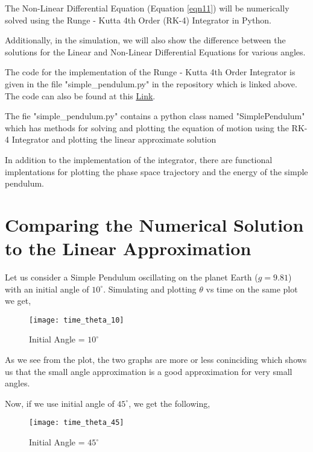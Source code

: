 \documentclass[12pt]{article}
\begin{document}
The Non-Linear Differential Equation (Equation \ref{eqn11}) will be numerically solved using the
Runge - Kutta 4th Order (RK-4) Integrator in Python.

Additionally, in the simulation, we will also show the difference between the solutions for
the Linear and Non-Linear Differential Equations for various angles. \newline

The code for the implementation of the Runge - Kutta 4th Order Integrator is given in the file "simple\_pendulum.py"
in the repository which is linked above. The code can also be found at this \textcolor{blue}{\underline{\href{https://github.com/kkin1995/simulations/simple_pendulum.py}{Link}}}. \newline

The fie "simple\_pendulum.py" contains a python class named "SimplePendulum" which has methods for solving and plotting the equation of motion using
the RK-4 Integrator and plotting the linear approximate solution \newline

In addition to the implementation of the integrator, there are functional implentations for plotting the phase space trajectory and the energy
of the simple pendulum. \newline

\section{Comparing the Numerical Solution to the Linear Approximation}

Let us consider a Simple Pendulum oscillating on the planet Earth ($g = 9.81$) with an initial angle of $10^\circ$. Simulating and plotting
$\theta$ vs time on the same plot we get,

\begin{figure}[H]
    \centering
    \caption{Initial Angle = $10^\circ$}
    \texttt{[image: time\_theta\_10]}
    \label{fig:theta10}
\end{figure}

As we see from the plot, the two graphs are more or less coninciding which shows us that the small angle approximation is a good approximation for
very small angles.

Now, if we use initial angle of $45^\circ$, we get the following,

\begin{figure}[H]
    \centering
    \caption{Initial Angle = $45^\circ$}
    \texttt{[image: time\_theta\_45]}
    \label{fig:theta45}
\end{figure}
\end{document}
